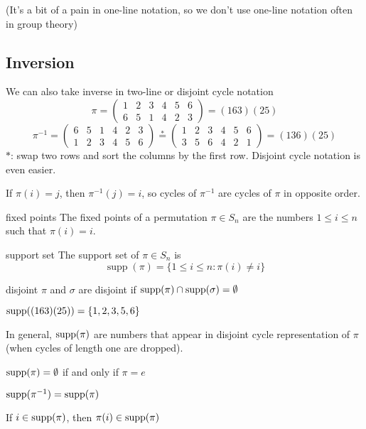 (It's a bit of a pain in one-line notation, so we don't use one-line notation often in group theory)

\subsection*{Inversion}
We can also take inverse in two-line or disjoint cycle notation
$$
\pi=\left(\begin{array}{llllll}
1 & 2 & 3 & 4 & 5 & 6 \\
6 & 5 & 1 & 4 & 2 & 3
\end{array}\right)=(163)(25)
$$
$$
\pi^{-1}=\left(\begin{array}{llllll}
6 & 5 & 1 & 4 & 2 & 3 \\
1 & 2 & 3 & 4 & 5 & 6
\end{array}\right)\stackrel{*}{=}\left(\begin{array}{llllll}
1 & 2 & 3 & 4 & 5 & 6 \\
3 & 5 & 6 & 4 & 2 & 1
\end{array}\right)=(136)(25)
$$
$*$: swap two rows and sort the columns by the first row. Disjoint cycle notation is even easier.

If $\pi(i)=j$, then $\pi^{-1}(j)=i$, so cycles of $\pi^{-1}$ are cycles of $\pi$ in opposite order.

\begin{defn}{fixed points}
The fixed points of a permutation $\pi\in S_n$ are the numbers $1\le i\le n$ such that $\pi(i)=i$.
\end{defn}

\begin{defn}{support set}
The support set of $\pi\in S_n$ is
$$\operatorname{supp}(\pi) = \{1\le i\le n:\pi(i)\ne i\}$$
\end{defn}

\begin{defn}{disjoint}
$\pi$ and $\sigma$ are disjoint if $\operatorname{supp}(\pi)\cap \operatorname{supp}(\sigma)=\emptyset$
\end{defn}

\begin{ex}
$\operatorname{supp}((163)(25)) = \{1,2,3,5,6\}$
\end{ex}

\begin{remark}
In general, $\operatorname{supp}(\pi)$ are numbers that appear in disjoint cycle representation of $\pi$ (when cycles of length one are dropped).

$\operatorname{supp}(\pi)=\emptyset$ if and only if $\pi=e$

$\operatorname{supp}(\pi^{-1}) = \operatorname{supp}(\pi)$

If $i\in\operatorname{supp}(\pi)$, then $\pi(i)\in \operatorname{supp}(\pi)$
\end{remark}

